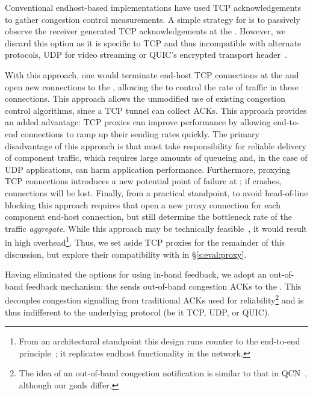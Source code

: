 
Conventional endhost-based implementations have used TCP acknowledgements to gather congestion control measurements. A simple strategy for \name is to passively observe the receiver generated TCP acknowledgements at the \inbox. However, we discard this option as it is specific to TCP and thus incompatible with alternate protocols, \ie UDP for video streaming or QUIC's encrypted transport header~\cite{quic}.

 With this approach, one would terminate end-host TCP connections at the \inbox and open new connections to the \outbox, allowing the \inbox to control the rate of traffic in these connections.
This approach allows the unmodified use of existing congestion control algorithms, since a TCP tunnel can collect ACKs. This approach provides an added advantage: TCP proxies can improve performance by allowing end-to-end connections to ramp up their sending rates quickly. 
 
The primary disadvantage of this approach is that \name must take responsibility for reliable delivery of component traffic, which requires large amounts of queueing and, in the case of UDP applications, can harm application performance. 
Furthermore, proxying TCP connections introduces a new potential point of failure at \name; if \name crashes, connections will be lost.
Finally, from a practical standpoint, to avoid head-of-line blocking this approach requires that \name open a new proxy connection for each component end-host connection, but still determine the bottleneck rate of the traffic \emph{aggregate}. While this approach may be technically feasible~\cite{cm}, it would result in high 
overhead\footnote{From an architectural standpoint this design runs counter to the end-to-end principle~\cite{e2e-principle}; it replicates endhost functionality in the network.}.
Thus, we set aside TCP proxies for the remainder of this discussion, but explore their compatibility with \name in \S\ref{s:eval:proxy}. 

 Having eliminated the options for using in-band feedback, we adopt an out-of-band feedback mechanism: the \outbox sends out-of-band congestion ACKs to the \inbox.
This decouples congestion signalling from traditional ACKs used for reliability\footnote{The idea of an out-of-band congestion notification is similar to that in QCN~\cite{qcn}, although our goals differ.} and is thus indifferent to the underlying protocol (be it TCP, UDP, or QUIC).

